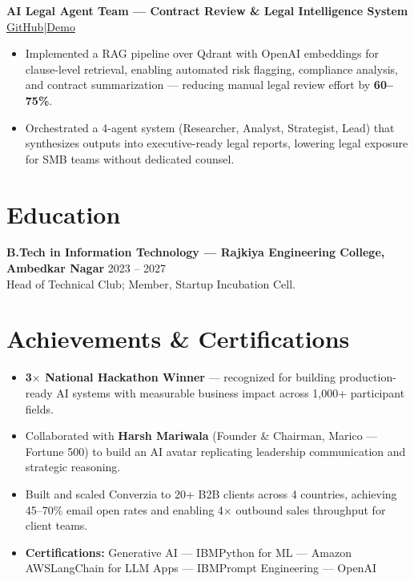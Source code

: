 \documentclass[a4paper,10pt]{article}
\newcommand{\entry}[2]{\textbf{#1} \hfill \small{#2}}
\begin{document}
\vspace{1.5pt}
\noindent\entry{AI Legal Agent Team — Contract Review \& Legal Intelligence System}{\href{https://github.com/ujjwaltiwari01/AI-Legal-Agent-Team}{GitHub}\enspace|\enspace\href{https://www.linkedin.com/posts/ujjwal-tiwaree_30days30aiagents-legaltech-startuptools-activity-7396755359065083905-Ov3o}{Demo}}\\[1.5pt]
{\small
\begin{itemize}
  \item Implemented a RAG pipeline over Qdrant with OpenAI embeddings for clause-level retrieval, enabling automated risk flagging, compliance analysis, and contract summarization — reducing manual legal review effort by \textbf{60--75\%}.
  \item Orchestrated a 4-agent system (Researcher, Analyst, Strategist, Lead) that synthesizes outputs into executive-ready legal reports, lowering legal exposure for SMB teams without dedicated counsel.
\end{itemize}
}
\vspace{-1pt}
 
\section*{Education}
\noindent\entry{B.Tech in Information Technology — Rajkiya Engineering College, Ambedkar Nagar}{2023 -- 2027}\\[1.5pt]
{\small Head of Technical Club; Member, Startup Incubation Cell.}
\vspace{-1pt}
 
\section*{Achievements \& Certifications}
{\small
\begin{itemize}
  \item \textbf{3$\times$ National Hackathon Winner} — recognized for building production-ready AI systems with measurable business impact across 1,000+ participant fields.
  \item Collaborated with \textbf{Harsh Mariwala} (Founder \& Chairman, Marico — Fortune 500) to build an AI avatar replicating leadership communication and strategic reasoning.
  \item Built and scaled Converzia to 20+ B2B clients across 4 countries, achieving 45--70\% email open rates and enabling 4$\times$ outbound sales throughput for client teams.
  \item \textbf{Certifications:} Generative AI — IBM\enspace\textbullet\enspace Python for ML — Amazon AWS\enspace\textbullet\enspace LangChain for LLM Apps — IBM\enspace\textbullet\enspace Prompt Engineering — OpenAI
\end{itemize}
}
 
\end{document}
